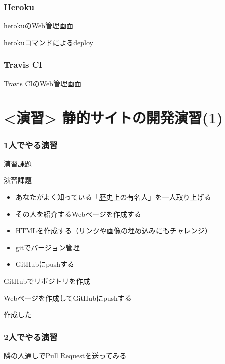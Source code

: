 \documentclass[12pt, t, aspectratio=169]{beamer}
\begin{document}
\section{Heroku}
\label{sec-7-1}
\begin{frame}[label=sec-7-1-1]{herokuのWeb管理画面}
\end{frame}
\begin{frame}[label=sec-7-1-2]{herokuコマンドによるdeploy}
\end{frame}
\section{Travis CI}
\label{sec-7-2}
\begin{frame}[label=sec-7-2-1]{Travis CIのWeb管理画面}
\end{frame}
\part{<演習> 静的サイトの開発演習(1)}
\label{sec-8}
\section{1人でやる演習}
\label{sec-8-1}
\begin{frame}[label=sec-8-1-1]{演習課題}
\begin{block}{演習課題}
\begin{itemize}
\item あなたがよく知っている「歴史上の有名人」を一人取り上げる
\item その人を紹介するWebページを作成する
\item HTMLを作成する（リンクや画像の埋め込みにもチャレンジ）
\item gitでバージョン管理
\item GitHubにpushする
\end{itemize}
\end{block}
\end{frame}
\begin{frame}[label=sec-8-1-2]{}
\end{frame}
\begin{frame}[label=sec-8-1-3]{GitHubでリポジトリを作成}
\end{frame}
\begin{frame}[label=sec-8-1-4]{Webページを作成してGitHubにpushする}
\end{frame}
\begin{frame}[label=sec-8-1-5]{作成した}
\end{frame}
\section{2人でやる演習}
\label{sec-8-2}
\begin{frame}[label=sec-8-2-1]{隣の人通しでPull Requestを送ってみる}
\end{frame}
\end{document}
